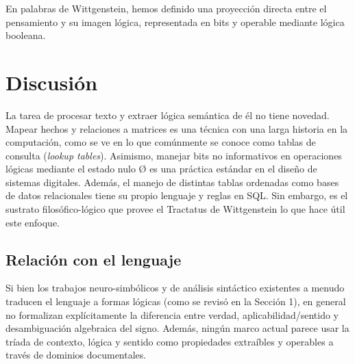 \documentclass{article}
\begin{document}
En palabras de Wittgenstein, hemos definido una proyección directa entre
el pensamiento y su imagen lógica, representada en bits y operable
mediante lógica booleana.

\hypertarget{discusiuxf3n}{%
\section{Discusión}\label{discusiuxf3n}}

La tarea de procesar texto y extraer lógica semántica de él no tiene
novedad. Mapear hechos y relaciones a matrices es una técnica con una
larga historia en la computación, como se ve en lo que comúnmente se
conoce como tablas de consulta (\emph{lookup tables}). Asimismo, manejar
bits no informativos en operaciones lógicas mediante el estado nulo Ø es
una práctica estándar en el diseño de sistemas digitales. Además, el
manejo de distintas tablas ordenadas como bases de datos relacionales
tiene su propio lenguaje y reglas en SQL. Sin embargo, es el sustrato
filosófico-lógico que provee el Tractatus de Wittgenstein lo que hace
útil este enfoque.

\hypertarget{relaciuxf3n-con-el-lenguaje}{%
\subsection{Relación con el
lenguaje}\label{relaciuxf3n-con-el-lenguaje}}

Si bien los trabajos neuro-simbólicos y de análisis sintáctico
existentes a menudo traducen el lenguaje a formas lógicas (como se
revisó en la Sección 1), en general no formalizan explícitamente la
diferencia entre verdad, aplicabilidad/sentido y desambiguación
algebraica del signo. Además, ningún marco actual parece usar la tríada
de contexto, lógica y sentido como propiedades extraíbles y operables a
través de dominios documentales.
\end{document}
